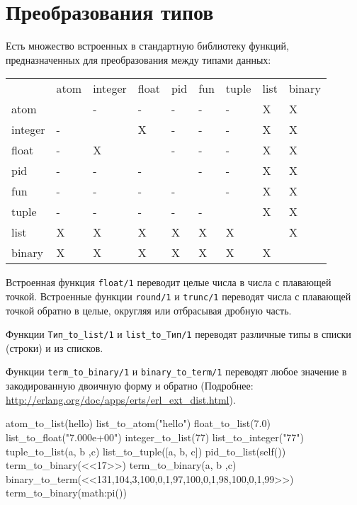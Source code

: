 \section{Преобразования типов}

Есть множество встроенных в стандартную библиотеку функций, предназначенных для
преобразования между типами данных:

\begin{center}
\begin{tabular}{|>{\raggedright}p{63pt}|>{\raggedright}p{30pt}|>{\raggedright}p{35pt}|>{\raggedright}p{21pt}|>{\raggedright}p{21pt}|>{\raggedright}p{21pt}|>{\raggedright}p{30pt}|>{\raggedright}p{21pt}|>{\raggedright}p{35pt}|}
\hline
\multicolumn{9}{|p{243pt}|}{Преобразования типов}\tabularnewline
\hline
 & atom & integer & float & pid & fun & tuple & list & binary\tabularnewline
\hline
atom &  & - & - & - & - & - & X & X\tabularnewline
\hline
integer & - &  & X & - & - & - & X & X\tabularnewline
\hline
float & - & X &  & - & - & - & X & X\tabularnewline
\hline
pid & - & - & - &  & - & - & X & X\tabularnewline
\hline
fun & - & - & - & - &  & - & X & X\tabularnewline
\hline
tuple & - & - & - & - & - &  & X & X\tabularnewline
\hline
list & X & X & X & X & X & X &  & X\tabularnewline
\hline
binary & X & X & X & X & X & X & X & \tabularnewline
\hline
\end{tabular}
\end{center}

Встроенная функция \texttt{float/1} переводит целые числа в числа с 
плавающей точкой. Встроенные функции \texttt{round/1} и \texttt{trunc/1} переводят
числа с плавающей точкой обратно в целые, округляя или отбрасывая дробную часть.

Функции \texttt{Тип\_to\_list/1} и \texttt{list\_to\_Тип/1}
переводят различные типы в списки (строки) и из списков.

Функции \texttt{term\_to\_binary/1} и \texttt{binary\_to\_term/1} переводят любое
значение в закодированную двоичную форму и обратно (Подробнее: 
\url{http://erlang.org/doc/apps/erts/erl_ext_dist.html}).

\begin{erlang}
atom_to_list(hello)        %
list_to_atom("hello")      %
float_to_list(7.0)         %
list_to_float("7.000e+00") %
integer_to_list(77)        %
list_to_integer("77")      %
tuple_to_list({a, b ,c})   %
list_to_tuple([a, b, c])   %
pid_to_list(self())        %
term_to_binary(<<17>>)     %
term_to_binary({a, b ,c})  %
binary_to_term(<<131,104,3,100,0,1,97,100,0,1,98,100,0,1,99>>)  
term_to_binary(math:pi())  %
\end{erlang}


